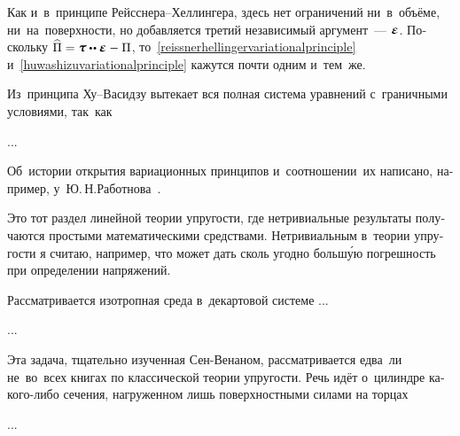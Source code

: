\begin{otherlanguage}{russian}
Как и~в~принципе Рейсснера\hbox{--}Хеллингера, здесь нет ограничений ни~в~объёме, ни~на~поверхности, но добавляется третий независимый аргумент~--- $\mathboldepsilon$. Поскольку ${\widehat{\Pi} = \mathboldtau \dotdotp \mathboldepsilon - \Pi}$, то~\eqref{reissnerhellingervariationalprinciple} и~\eqref{huwashizuvariationalprinciple} кажутся почти одним и~тем~же.

Из~принципа Ху\hbox{--}Васидзу вытекает вся полная система уравнений с~граничными условиями, так~как

...


Об~истории открытия вариационных принципов и~соотношении~их написано, например, у~Ю.\,Н.\;Работнова~\cite{rabotnov-mechanicsofdeformable}.



Это тот раздел линейной теории упругости, где нетривиальные результаты получаются простыми математическими средствами. Нетривиальным в~теории упругости я считаю, например, что  может дать сколь угодно больш\'{у}ю погрешность при определении напряжений.

Рассматривается изотропная среда в~декартовой системе ...

...





Эта задача, тщательно изученная Сен\hbox{-}Венаном, рассматривается едва~ли не~во~всех книгах по классической теории упругости. Речь идёт о~цилиндре какого\hbox{-}либо сечения, нагруженном лишь поверхностными силами на торцах

...




\end{otherlanguage}
